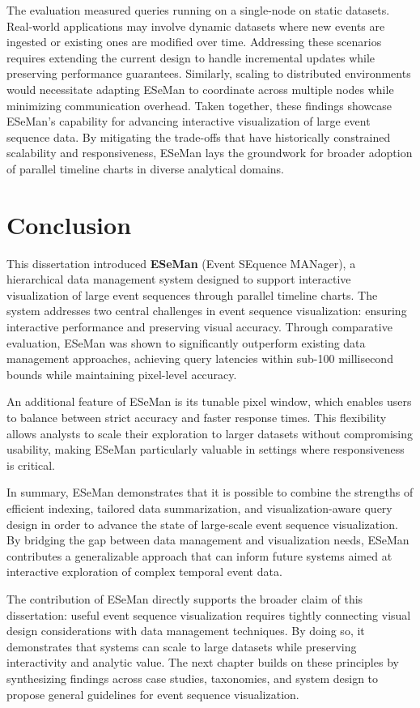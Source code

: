\begin{refsection}
The evaluation measured queries running on a single-node on static datasets. Real-world applications may involve dynamic datasets where new events are ingested or existing ones are modified over time. Addressing these scenarios requires extending the current design to handle incremental updates while preserving performance guarantees. Similarly, scaling to distributed environments would necessitate adapting ESeMan to coordinate across multiple nodes while minimizing communication overhead.  
Taken together, these findings showcase ESeMan's capability for advancing interactive visualization of large event sequence data. By mitigating the trade-offs that have historically constrained scalability and responsiveness, ESeMan lays the groundwork for broader adoption of parallel timeline charts in diverse analytical domains.

\section{Conclusion}
\label{sec:eseman_conclusion}

This dissertation introduced \textbf{ESeMan} (Event SEquence MANager), a hierarchical data management system designed to support interactive visualization of large event sequences through parallel timeline charts. The system addresses two central challenges in event sequence visualization: ensuring interactive performance and preserving visual accuracy. Through comparative evaluation, ESeMan was shown to significantly outperform existing data management approaches, achieving query latencies within sub-100 millisecond bounds while maintaining pixel-level accuracy.  

An additional feature of ESeMan is its tunable pixel window, which enables users to balance between strict accuracy and faster response times. This flexibility allows analysts to scale their exploration to larger datasets without compromising usability, making ESeMan particularly valuable in settings where responsiveness is critical.  

In summary, ESeMan demonstrates that it is possible to combine the strengths of efficient indexing, tailored data summarization, and visualization-aware query design in order to advance the state of large-scale event sequence visualization. By bridging the gap between data management and visualization needs, ESeMan contributes a generalizable approach that can inform future systems aimed at interactive exploration of complex temporal event data.

The contribution of ESeMan directly supports the broader claim of this dissertation: useful event sequence visualization requires tightly connecting visual design considerations with data management techniques. By doing so, it demonstrates that systems can scale to large datasets while preserving interactivity and analytic value. The next chapter builds on these principles by synthesizing findings across case studies, taxonomies, and system design to propose general guidelines for event sequence visualization.

\printbibliography[heading=subbibnumbered]
\end{refsection}